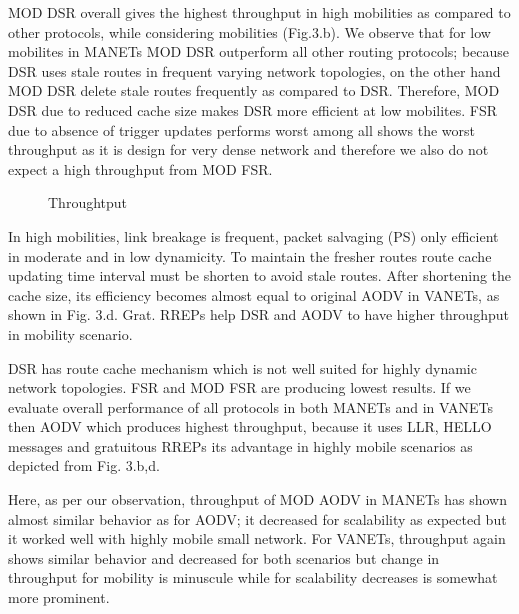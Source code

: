 \documentclass[journal]{IEEEtran}
\begin{document}
MOD DSR overall gives the highest throughput in high mobilities as compared to other protocols, while considering mobilities (Fig.3.b).
We observe that for low mobilites in MANETs MOD DSR outperform all other routing protocols; because DSR uses stale routes in frequent varying network topologies, on the other hand MOD DSR delete stale routes frequently as compared to DSR.
Therefore, MOD DSR due to reduced cache size makes DSR more efficient at low mobilites.
FSR due to absence of trigger updates performs worst among all shows the worst throughput as it is design for very dense network and therefore we also do not expect a high throughput from MOD FSR.

\begin{figure*}[t]
  \centering
\caption{Throughtput}
\end{figure*}
\vspace{0.3cm}
\hspace{0.3cm}\small

In high mobilities, link breakage is frequent, packet salvaging (PS) only efficient in moderate and in low dynamicity. To maintain the fresher routes route cache updating time interval must be shorten to avoid stale routes.
 After shortening the cache size, its efficiency becomes almost equal to original AODV in VANETs, as shown in Fig. 3.d. Grat. RREPs help DSR and AODV to have higher throughput in mobility scenario.

DSR has route cache mechanism which is not well suited for highly dynamic network topologies. FSR and MOD FSR are producing lowest results.
If we evaluate overall performance of all protocols in both MANETs and in VANETs then AODV which produces highest throughput, because it uses LLR, HELLO messages and gratuitous RREPs its advantage in highly mobile scenarios as depicted from  Fig. 3.b,d.

Here, as per our observation, throughput of MOD AODV in MANETs has shown almost similar behavior as for AODV; it decreased for scalability as expected but it worked well with highly mobile small network. For VANETs, throughput again shows similar behavior and decreased for both scenarios but change in throughput for mobility is minuscule while for scalability decreases is somewhat more prominent.
\end{document}
